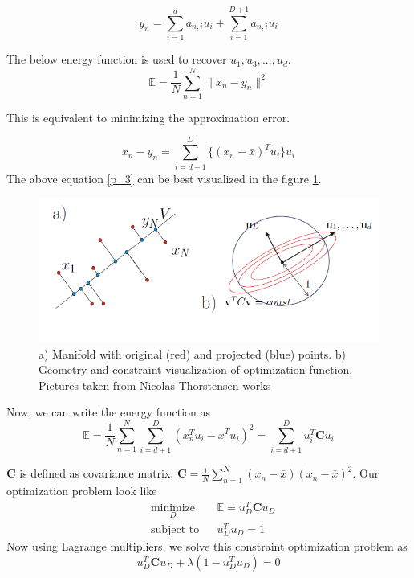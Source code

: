 \begin{equation}
y_n = \sum_{i=1}^{d} a_{n,i}u_{i} + \sum_{i=1}^{D+1} a_{n,i}u_{i}
\end{equation}

The below energy function is used to recover $u_1, u_3, ..., u_d$.
\begin{equation}
\mathbb{E} = \frac{1}{N}\sum_{n=1}^{N} \|x_n - y_n\|^{2}
\end{equation}

This is equivalent to minimizing the approximation error. 

\begin{equation}
x_n - y_n = \sum_{i=d+1}^{D} \{(x_n - \bar{x})^T u_i\}u_i
\label{p_3}
\end{equation} 
The above equation \ref{p_3} can be best visualized in the figure \ref{pca}.

\begin{figure}[ht]
\begin{center}
\includegraphics[width=\textwidth]{./Figures/pca.png}
\caption{a) Manifold with original (red) and projected (blue) points. b) Geometry and constraint visualization of optimization function. Pictures taken from Nicolas Thorstensen works \citep{Ety2008}}
\label{pca}
\end{center}
\end{figure}

Now, we can write the energy function as
\begin{equation}
\mathbb{E} = \frac{1}{N}\sum_{n=1}^{N}\sum_{i=d+1}^{D} (x_n^{T}u_{i}- \bar{x}^{T}u_i)^2 = \sum_{i=d+1}^{D}u_{i}^{T}\mathbf{C}u_{i}
\end{equation}

$\mathbf{C}$ is defined as covariance matrix, $\mathbf{C} = \frac{1}{N}\sum_{n=1}^{N}(x_n-\bar{x})(x_n -\bar{x})^2$. Our optimization problem look like
\begin{equation}
\begin{aligned}
& \underset{D}{\text{minimize}}
&& \mathbb{E} = u_{D}^{T}\mathbf{C}u_{D} \\
& \text{subject to}
&& u_{D}^{T}u_{D} = 1
\end{aligned}
\end{equation}
Now using Lagrange multipliers, we solve this constraint optimization problem as
\begin{equation}
u_{D}^{T}\mathbf{C}u_{D}+\lambda(1-u_{D}^{T}u_{D})=0
\label{LM}
\end{equation}

